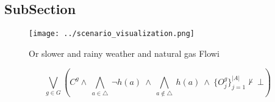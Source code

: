 \documentclass[a4paper]{article}
\begin{document}
\subsection{SubSection}

\begin{figure}
\centering
\texttt{[image: ../scenario\_visualization.png]}
\caption{Or slower and rainy weather and natural gas Flowi
}
\end{figure}
 
\[\bigvee_{g\in G} (C^g \wedge\ \bigwedge_{a\in \triangle}\ \neg h(a)\ \wedge\ \bigwedge_{a\notin \triangle}\ h(a)\ \wedge\ \{O_j^g\}_{j=1}^{|A|} \nvdash\ \bot )\]
\end{document}
